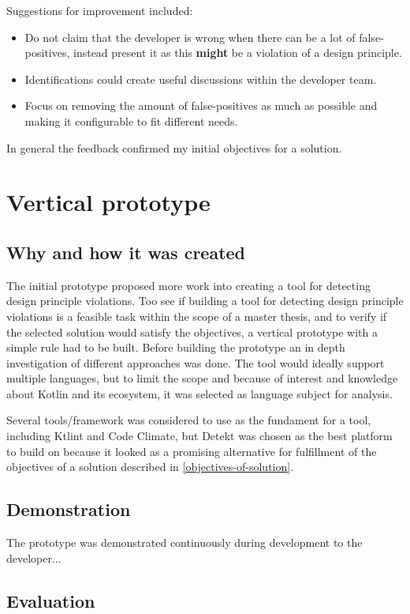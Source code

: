 \documentclass{report}
\begin{document}
Suggestions for improvement included: 
\begin{itemize}
    \item Do not claim that the developer is wrong when there can be a lot of false-positives, instead present it as this \textbf{might} be a violation of a design principle.
    \item Identifications could create useful discussions within the developer team.
    \item Focus on removing the amount of false-positives as much as possible and making it configurable to fit different needs.
\end{itemize}

In general the feedback confirmed my initial objectives for a solution.

\section{Vertical prototype}

\subsection*{Why and how it was created}
The initial prototype proposed more work into creating a tool for detecting design principle violations. Too see if building a tool for detecting design principle violations is a feasible task within the scope of a master thesis, and to verify if the selected solution would satisfy the objectives, a vertical prototype with a simple rule had to be built. Before building the prototype an in depth investigation of different approaches was done. The tool would ideally support multiple languages, but to limit the scope and because of interest and knowledge about Kotlin and its ecosystem, it was selected as language subject for analysis. 

Several tools/framework was considered to use as the fundament for a tool, including Ktlint and Code Climate, but Detekt was chosen as the best platform to build on because it looked as a promising alternative for fulfillment of the objectives of a solution described in \ref{objectives-of-solution}.

\subsection*{Demonstration}
The prototype was demonstrated continuously during development to the developer...

\subsection*{Evaluation}
\end{document}
